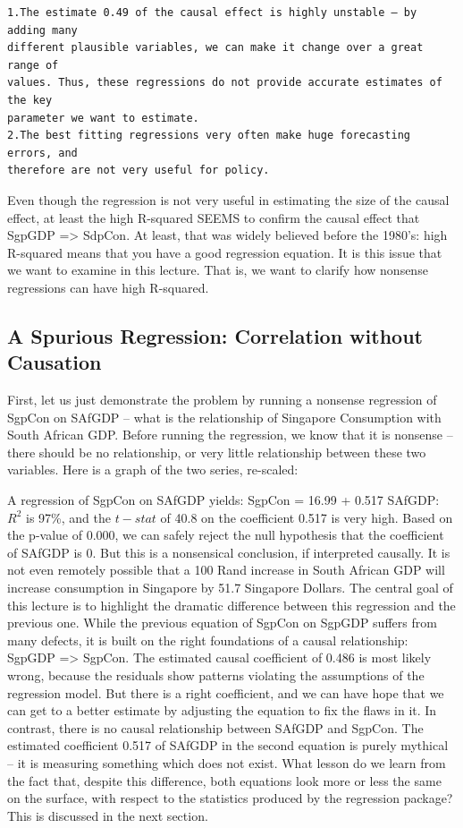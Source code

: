 \documentclass[
  letterpaper,
  DIV=11,
  numbers=noendperiod]{scrartcl}
\begin{document}
\begin{verbatim}
1.The estimate 0.49 of the causal effect is highly unstable – by adding many
different plausible variables, we can make it change over a great range of
values. Thus, these regressions do not provide accurate estimates of the key
parameter we want to estimate.
2.The best fitting regressions very often make huge forecasting errors, and
therefore are not very useful for policy. 
\end{verbatim}

Even though the regression is not very useful in estimating the size of
the causal effect, at least the high R-squared SEEMS to confirm the
causal effect that SgpGDP =\textgreater{} SdpCon. At least, that was
widely believed before the 1980's: high R-squared means that you have a
good regression equation. It is this issue that we want to examine in
this lecture. That is, we want to clarify how nonsense regressions can
have high R-squared.

\hypertarget{a-spurious-regression-correlation-without-causation}{%
\subsection{A Spurious Regression: Correlation without
Causation}\label{a-spurious-regression-correlation-without-causation}}

First, let us just demonstrate the problem by running a nonsense
regression of SgpCon on SAfGDP -- what is the relationship of Singapore
Consumption with South African GDP. Before running the regression, we
know that it is nonsense -- there should be no relationship, or very
little relationship between these two variables. Here is a graph of the
two series, re-scaled:

A regression of SgpCon on SAfGDP yields: SgpCon = 16.99 + 0.517 SAfGDP:
\(R^2\) is 97\%, and the \(t-stat\) of 40.8 on the coefficient 0.517 is
very high. Based on the p-value of 0.000, we can safely reject the null
hypothesis that the coefficient of SAfGDP is 0. But this is a
nonsensical conclusion, if interpreted causally. It is not even remotely
possible that a 100 Rand increase in South African GDP will increase
consumption in Singapore by 51.7 Singapore Dollars. The central goal of
this lecture is to highlight the dramatic difference between this
regression and the previous one. While the previous equation of SgpCon
on SgpGDP suffers from many defects, it is built on the right
foundations of a causal relationship: SgpGDP =\textgreater{} SgpCon. The
estimated causal coefficient of 0.486 is most likely wrong, because the
residuals show patterns violating the assumptions of the regression
model. But there is a right coefficient, and we can have hope that we
can get to a better estimate by adjusting the equation to fix the flaws
in it. In contrast, there is no causal relationship between SAfGDP and
SgpCon. The estimated coefficient 0.517 of SAfGDP in the second equation
is purely mythical -- it is measuring something which does not exist.
What lesson do we learn from the fact that, despite this difference,
both equations look more or less the same on the surface, with respect
to the statistics produced by the regression package? This is discussed
in the next section.
\end{document}
